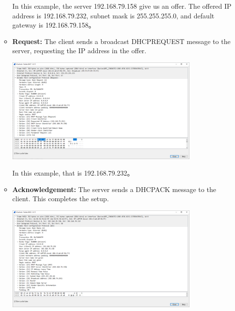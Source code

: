 \documentclass[12pt, a4paper]{article}
\begin{document}
\begin{enumerate}
\begin{itemize}
      In this example, the server 192.168.79.158 give us an offer. The offered
      IP address is 192.168.79.232, subnet mask is 255.255.255.0, and
      default gateway is 192.168.79.158。

      \pagebreak
      \item \textbf{Request:} The client sends a broadcast DHCPREQUEST message
      to the server, requesting the IP address in the offer.

      \includegraphics[width=0.8\textwidth]{wireshark_dhcp_request.png}

      In this example, that is 192.168.79.232。

      \item \textbf{Acknowledgement:} The server sends a DHCPACK message to
      the client. This completes the setup.

      \includegraphics[width=0.8\textwidth]{wireshark_dhcp_ack.png}
    \end{itemize}


\end{enumerate}
\end{document}
